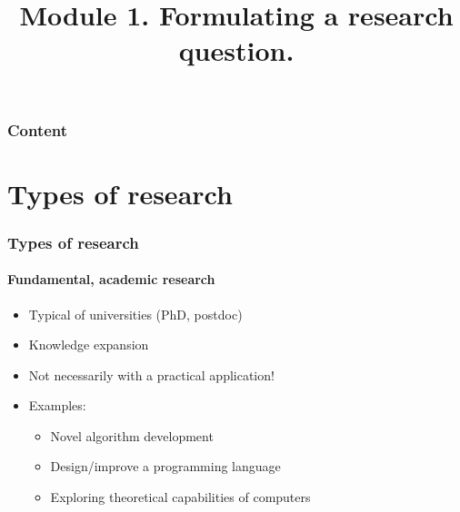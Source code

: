 \documentclass[aspectratio=169]{beamer}
\title{Module 1. Formulating a research question.}
\subtitle{\coursename}
\author{\lecturers}   %
\date{\academicyear}
\begin{document}
    
    
    \begin{frame}
        \maketitle
    \end{frame}
    
    \begin{frame}
        \frametitle{Content}
        
        \tableofcontents
    \end{frame}
    
    \section{Types of research}
    
    \begin{frame}
        \frametitle{Types of research}
        \framesubtitle{Fundamental, academic research}
        
        \begin{itemize}
            \item Typical of universities (PhD, postdoc)
            \item Knowledge expansion
            \item Not necessarily with a practical application!
            \item Examples:
            \begin{itemize}
                \item Novel algorithm development
                \item Design/improve a programming language
                \item Exploring theoretical capabilities of computers
            \end{itemize}
        \end{itemize}
        
    \end{frame}
    
\end{document}
